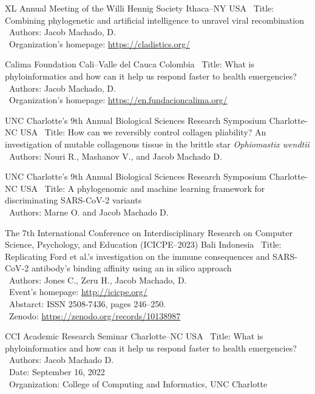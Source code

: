 \documentclass[11pt, letterpaper, sans]{moderncv}
\begin{document}
	{XL Annual Meeting of the Willi Hennig Society}
	{Ithaca--NY}
	{USA}
	{}
	{
		\textbullet~Title: Combining phylogenetic and artificial intelligence to unravel viral recombination\\
		\textbullet~Authors: Jacob Machado, D.\\
		\textbullet~Organization's homepage: \url{https://cladistics.org/}
	}
	
\cventry{---}
	{Calima Foundation}
	{Cali--Valle del Cauca}
	{Colombia}
	{}
	{
		\textbullet~Title: What is phyloinformatics and how can it help us respond faster to health emergencies?\\
		\textbullet~Authors: Jacob Machado, D.\\
		\textbullet~Organization's homepage: \url{https://en.fundacioncalima.org/}
	}

\cventry{---}
	{UNC Charlotte’s 9th Annual Biological Sciences Research Symposium}
	{Charlotte-NC}
	{USA}
	{}
	{
		\textbullet~Title: How can we reversibly control collagen pliability? An investigation of mutable collagenous tissue in the brittle star \textit{Ophiomastix wendtii}\\
		\textbullet~Authors: Nouri R., Mashanov V., and Jacob Machado D.\\
	}

\cventry{---}
	{UNC Charlotte’s 9th Annual Biological Sciences Research Symposium}
	{Charlotte-NC}
	{USA}
	{}
	{
		\textbullet~Title: A phylogenomic and machine learning framework for discriminating SARS-CoV-2 variants\\
		\textbullet~Authors: Marne O. and Jacob Machado D.\\
	}

\cventry{---}
	{The 7th International Conference on Interdisciplinary Research on Computer Science, Psychology, and Education (ICICPE--2023)}
	{Bali}
	{Indonesia}
	{}
	{
		\textbullet~Title: Replicating Ford et al.’s investigation on the immune consequences and SARS-CoV-2 antibody’s binding affinity using an in silico approach\\
		\textbullet~Authors: Jones C., Zeru H., Jacob Machado, D.\\
		\textbullet~Event's homepage: \url{http://icicpe.org/}\\
		\textbullet~Abstarct: ISSN 2508-7436, pages 246--250.\\
		\textbullet~Zenodo: \url{https://zenodo.org/records/10138987}
	}

	{CCI Academic Research Seminar}
	{Charlotte--NC}
	{USA}
	{}
	{
		\textbullet~Title: What is phyloinformatics and how can it help us respond faster to health emergencies?\\
		\textbullet~Authors: Jacob Machado D.\\
		\textbullet~Date: September 16, 2022\\
		\textbullet~Organization: College of Computing and Informatics, UNC Charlotte
	}
\end{document}
